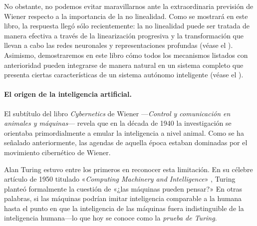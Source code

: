 \documentclass[../../book-main_es.tex]{subfiles}
\begin{document}
No obstante, no podemos evitar maravillarnos ante la extraordinaria previsión de Wiener respecto a
la importancia de la no linealidad. Como se mostrará en este libro, la
respuesta llegó sólo recientemente: la no linealidad puede ser tratada
de manera efectiva a través de la linearización progresiva y la 
transformación que llevan a cabo las redes neuronales y representaciones
profundas (véase el ). Asimismo, demostraremos en
este libro cómo todos los mecanismos listados con anterioridad pueden
integrarse de manera natural en un sistema completo que presenta ciertas
características de un sistema autónomo inteligente (véase 
el ).

\paragraph{El origen de la inteligencia artificial.}
El subtítulo del libro \textit{Cybernetics} de Wiener ---\textit{Control y
comunicación en animales y máquinas}--- revela que en la década de 1940
la investigación se orientaba primordialmente a emular la inteligencia 
a nivel animal. Como se ha señalado anteriormente, las agendas de aquella 
época estaban dominadas por el movimiento cibernético de Wiener.

Alan Turing estuvo entre los primeros en reconocer esta limitación. En
su célebre artículo de 1950 titulado «\textit{Computing Machinery and
Intelligence}» \cite{Turing-1950}, Turing planteó formalmente la
cuestión de «¿las máquinas pueden pensar?» En otras palabras, si 
las máquinas podrían imitar inteligencia comparable a la humana
hasta el punto en que la inteligencia de las máquinas fuera indistinguible
de la inteligencia humana---lo que hoy se conoce como la
\textit{prueba de Turing}.
\end{document}
